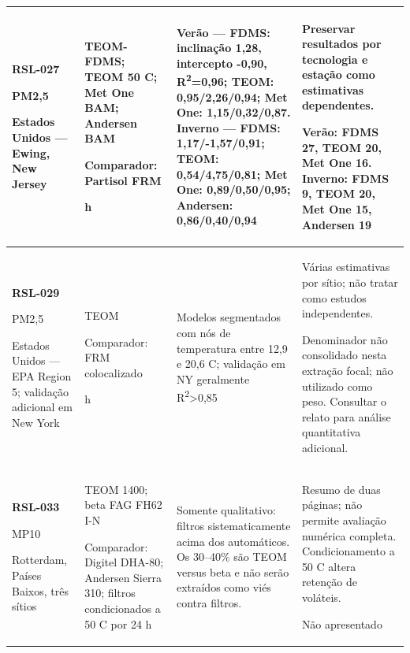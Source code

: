 \begin{longtable}{|P{0.18\textwidth}|P{0.25\textwidth}|P{0.28\textwidth}|P{\arrayrulewidth\relax}|}
\textbf{RSL-027}\par\textcite{rsl027}\par PM2,5\par Estados Unidos --- Ewing, New Jersey & TEOM-FDMS; TEOM 50 \textdegree{}C; Met One BAM; Andersen BAM\par\medskip Comparador: Partisol FRM\par{} h & Verão --- FDMS: inclinação 1,28, intercepto -0,90, R\textsuperscript{2}=0,96; TEOM: 0,95/2,26/0,94; Met One: 1,15/0,32/0,87. Inverno --- FDMS: 1,17/-1,57/0,91; TEOM: 0,54/4,75/0,81; Met One: 0,89/0,50/0,95; Andersen: 0,86/0,40/0,94 & Preservar resultados por tecnologia e estação como estimativas dependentes.\par\medskip Verão: FDMS 27, TEOM 20, Met One 16. Inverno: FDMS 9, TEOM 20, Met One 15, Andersen 19\\\hline
\textbf{RSL-029}\par\textcite{rsl029}\par PM2,5\par Estados Unidos --- EPA Region 5; validação adicional em New York & TEOM\par\medskip Comparador: FRM colocalizado\par{} h & Modelos segmentados com nós de temperatura entre 12,9 e 20,6 \textdegree{}C; validação em NY geralmente R\textsuperscript{2}>0,85 & Várias estimativas por sítio; não tratar como estudos independentes.\par\medskip Denominador não consolidado nesta extração focal; não utilizado como peso. Consultar o relato para análise quantitativa adicional.\\\hline
\textbf{RSL-033}\par\textcite{rsl033}\par MP10\par Rotterdam, Países Baixos, três sítios & TEOM 1400; beta FAG FH62 I-N\par\medskip Comparador: Digitel DHA-80; Andersen Sierra 310; filtros condicionados a 50 \textdegree{}C por 24 h\par\medskip  & Somente qualitativo: filtros sistematicamente acima dos automáticos. Os 30--40\% são TEOM versus beta e não serão extraídos como viés contra filtros. & Resumo de duas páginas; não permite avaliação numérica completa. Condicionamento a 50 \textdegree{}C altera retenção de voláteis.\par\medskip Não apresentado\\\hline

\end{longtable}
